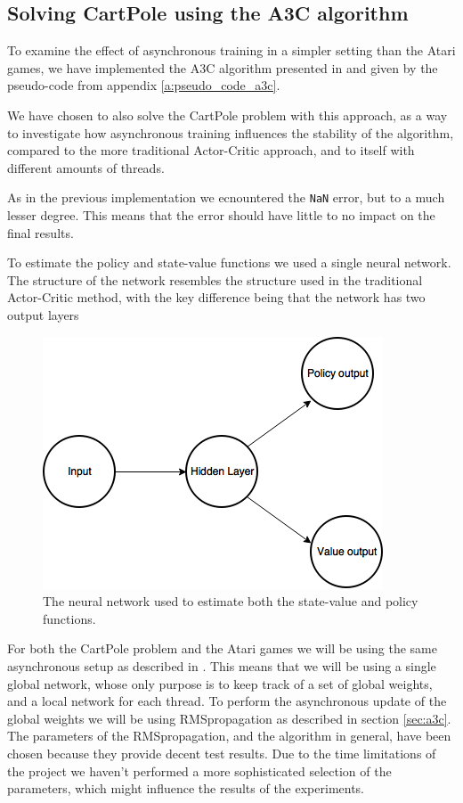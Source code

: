 \documentclass[11pt]{article}
\begin{document}
\subsection{Solving CartPole using the A3C algorithm}

To examine the effect of asynchronous training in a simpler setting than
the Atari games, we have implemented the A3C algorithm presented
in \cite{a3c} and given by the pseudo-code from appendix \ref{a:pseudo_code_a3c}.

We have chosen to also solve the CartPole problem with this approach, as a way to
investigate how asynchronous training influences the stability of the algorithm,
compared to the more traditional Actor-Critic approach, and 
to itself with different amounts of threads.

As in the previous implementation we ecnountered the \texttt{NaN} error,
but to a much lesser degree.
This means that the error should have little to no impact on
the final results.

To estimate the policy and state-value functions we used a single
neural network.
The structure of the network resembles the structure used in the traditional
Actor-Critic method, with the key difference being that the network has
two output layers

\begin{figure}[H]
    \centering
    \includegraphics[scale=0.5]{include/shared_cartpole.png}
    \caption{The neural network used to estimate both the state-value
             and policy functions.}
    \label{fig:s_cartpole}
\end{figure}

For both the CartPole problem and the Atari games we will be using the same asynchronous setup
as described in \cite{a3c}.
This means that we will be using a single global network, whose only
purpose is to keep track of a set of global weights, and a local network
for each thread.
To perform the asynchronous update of the global weights we will be using
RMSpropagation as described in section \ref{sec:a3c}.
The parameters of the RMSpropagation, and the algorithm in general, have
been chosen because they provide decent test results.
Due to the time limitations of the project we haven't performed
a more sophisticated selection of the parameters, which might
influence the results of the experiments.
\end{document}
